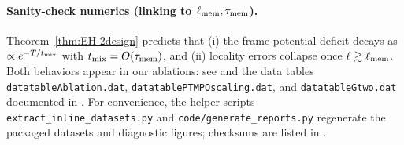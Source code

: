 \documentclass[a4paper,11pt]{article}
\theoremstyle{plain}
\theoremstyle{definition}
\theoremstyle{remark}
\begin{document}
\paragraph{Sanity-check numerics (linking to $\ell_{\rm mem},\tau_{\rm mem}$).}
Theorem~\ref{thm:EH-2design} predicts that (i) the frame-potential deficit decays as $\propto e^{-T/t_{\rm mix}}$ with $t_{\rm mix}=O(\tau_{\rm mem})$, and (ii) locality errors collapse once $\ell\gtrsim\ell_{\rm mem}$.
Both behaviors appear in our ablations: see  and the data tables
\texttt{datatableAblation.dat}, \texttt{datatablePTMPOscaling.dat}, and \texttt{datatableGtwo.dat} documented in .
For convenience, the helper scripts \texttt{extract_inline_datasets.py} and \texttt{code/generate_reports.py} regenerate the packaged datasets and diagnostic figures;
checksums are listed in .
\end{document}
